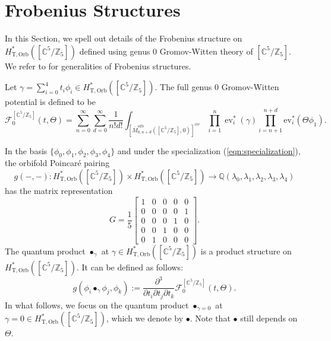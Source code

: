 \documentclass[12pt]{amsart}
\numberwithin{equation}{section}
\begin{document}
\section{Frobenius Structures}\label{subsec:frob}
In this Section, we spell out details of the Frobenius structure on $H^{*}_{\mathrm{T,Orb}}\left(\left[\mathbb{C}^5/\mathbb{Z}_5\right]\right)$ defined using genus $0$ Gromov-Witten theory of $[\mathbb{C}^5/\mathbb{Z}_5]$. We refer to \cite{lp} for generalities of Frobenius structures.

Let $\gamma=\sum_{i=0}^{4}t_i\phi_i\in H^{*}_{\mathrm{T,Orb}}\left(\left[\mathbb{C}^5/\mathbb{Z}_5\right]\right)$. The full genus $0$ Gromov-Witten potential is defined to be
\begin{equation}\label{eqn:full_GW_potential}
    \mathcal{F}_0^{\left[\mathbb{C}^5 / \mathbb{Z}_5\right]}(t, \Theta)
    =\sum_{n=0}^{\infty} \sum_{d=0}^{\infty} \frac{1}{n ! d !}\int_{\left[\overline{M}_{0, n+d}^{\mathrm{orb}}\left(\left[\mathbb{C}^{5} / \mathbb{Z}_{5}\right], 0\right)\right]^{v i r}}  \prod_{i=1}^n \operatorname{ev}_i^*(\gamma) \prod_{i=n+1}^{n+d} \mathrm{ev}_i^*\left(\Theta \phi_1\right).
\end{equation}

In the basis $\{\phi_0,\phi_1,\phi_2, \phi_3,\phi_{4}\}$ and under the specialization (\ref{eqn:specialization}), the orbifold Poincar\'e pairing 
\begin{equation*}
    g(-,-): H^{*}_{\mathrm{T,Orb}}\left(\left[\mathbb{C}^5/\mathbb{Z}_5\right]\right)\times H^{*}_{\mathrm{T,Orb}}\left(\left[\mathbb{C}^5/\mathbb{Z}_5\right]\right)\to \mathbb{Q}(\lambda_0,\lambda_1, \lambda_2, \lambda_3,\lambda_{4})
\end{equation*}
has the matrix representation 
\begin{equation}
G=\frac{1}{5}
\begin{bmatrix}
1 & 0 & 0 & 0 & 0 \\
0 & 0 & 0 & 0 & 1 \\
0 & 0 & 0 & 1 & 0 \\
0 & 0 & 1 & 0 & 0 \\
0 & 1 & 0 & 0 & 0
\end{bmatrix}.
\end{equation}
The quantum product $\bullet_\gamma$ at $\gamma\in H^{*}_{\mathrm{T,Orb}}\left(\left[\mathbb{C}^5/\mathbb{Z}_5\right]\right)$ is a product structure on $H^{*}_{\mathrm{T,Orb}}\left(\left[\mathbb{C}^5/\mathbb{Z}_5\right]\right)$. It can be defined as follows:
\begin{equation*}
    g(\phi_i\bullet_\gamma \phi_j, \phi_k):=\frac{\partial^3}{\partial t_i\partial t_j\partial t_k}\mathcal{F}_0^{\left[\mathbb{C}^5 / \mathbb{Z}_5\right]}(t, \Theta).
\end{equation*}
In what follows, we focus on the quantum product $\bullet_{\gamma=0}$ at $\gamma=0\in H^{*}_{\mathrm{T,Orb}}\left(\left[\mathbb{C}^5/\mathbb{Z}_5\right]\right)$, which we denote by $\bullet$. Note that $\bullet$ still depends on $\Theta$.
\end{document}
